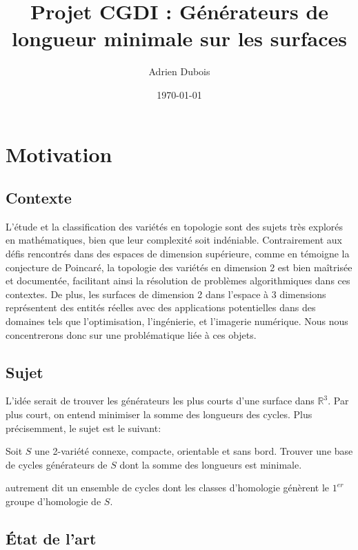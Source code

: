 \documentclass[french]{article}
\title{Projet CGDI : Générateurs de longueur minimale sur les surfaces}
\author{Adrien Dubois}
\date{\today}
\begin{document}
\maketitle
\begingroup 
\hypersetup{linkcolor=black}
\tableofcontents
\endgroup

\section{Motivation}

\subsection{Contexte}

\indent L'étude et la classification des variétés en topologie sont des sujets très explorés en mathématiques, bien que leur complexité soit indéniable. 
Contrairement aux défis rencontrés dans des espaces de dimension supérieure, 
comme en témoigne la conjecture de Poincaré, 
la topologie des variétés en dimension 2 est bien maîtrisée et documentée, 
facilitant ainsi la résolution de problèmes algorithmiques dans ces contextes. 
De plus, les surfaces de dimension 2 dans l'espace à 3 dimensions représentent des entités réelles avec des applications potentielles dans des domaines tels que l'optimisation, l'ingénierie, et l'imagerie numérique. 
Nous nous concentrerons donc sur une problématique liée à ces objets.

\subsection{Sujet}

L'idée serait de trouver les générateurs les plus courts d'une surface dans $\mathbb{R}^3$. 
Par plus court, on entend minimiser la somme des longueurs des cycles.
Plus précisemment, le sujet est le suivant:

\begin{center}
    Soit $S$ une 2-variété connexe, compacte, orientable et sans bord. \newline
    Trouver une base de cycles générateurs de $S$ dont la somme des longueurs est minimale.
\end{center}
autrement dit un ensemble de cycles dont les classes d’homologie génèrent le $1^{er}$ groupe d’homologie de $S$.

\subsection{État de l'art}
\end{document}
